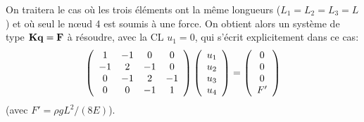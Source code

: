 \medskip
On traitera le cas où les trois éléments ont la même longueurs ($L_1=L_2=L_3=L$) et où seul le nœud 4 est
soumis à une force.
%
On obtient alors un système de type $\mathbf{K}\mathbf{q}=\mathbf{F}$ à résoudre, avec la CL $u_1=0$, qui s'écrit
explicitement dans ce cas:
\begin{equation}
\left(  \begin{array}{cccc} 1 & -1 & 0 & 0 \\ -1 & 2 & -1 & 0 \\ 0 & -1 & 2 & -1\\ 0&0&-1&1
\end{array} \right)
\left(  \begin{array}{c} u_1\\u_2\\u_3\\u_4 \end{array}\right)
=
\left(  \begin{array}{c} 0\\0\\0\\F' \end{array}\right)
\end{equation}
(avec $F'=\rho g L^2/(8E)$).







